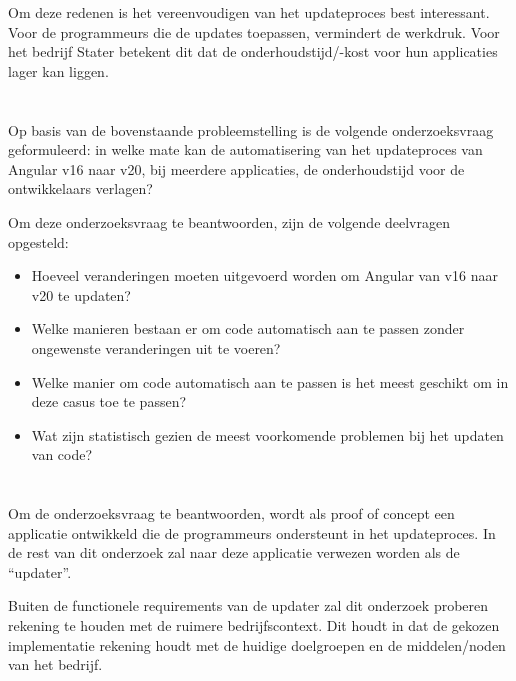 Om deze redenen is het vereenvoudigen van het updateproces best interessant.
Voor de programmeurs die de updates toepassen, vermindert de werkdruk.
Voor het bedrijf Stater betekent dit dat de onderhoudstijd/-kost voor hun applicaties lager kan liggen.

\section{}%
\label{sec:onderzoeksvraag}

Op basis van de bovenstaande probleemstelling is de volgende onderzoeksvraag geformuleerd: in welke mate kan de automatisering van het updateproces van Angular v16 naar v20, bij meerdere applicaties, de onderhoudstijd voor de ontwikkelaars verlagen?

Om deze onderzoeksvraag te beantwoorden, zijn de volgende deelvragen opgesteld:
\begin{itemize}
  \item Hoeveel veranderingen moeten uitgevoerd worden om Angular van v16 naar v20 te updaten?
  \item Welke manieren bestaan er om code automatisch aan te passen zonder ongewenste veranderingen uit te voeren?
  \item Welke manier om code automatisch aan te passen is het meest geschikt om in deze casus toe te passen?
  \item Wat zijn statistisch gezien de meest voorkomende problemen bij het updaten van code?
\end{itemize}

\section{}%
\label{sec:onderzoeksdoelstelling}

Om de onderzoeksvraag te beantwoorden, wordt als proof of concept een applicatie ontwikkeld die de programmeurs ondersteunt in het updateproces.
In de rest van dit onderzoek zal naar deze applicatie verwezen worden als de ``updater''.

Buiten de functionele requirements van de updater zal dit onderzoek proberen rekening te houden met de ruimere bedrijfscontext.
Dit houdt in dat de gekozen implementatie rekening houdt met de huidige doelgroepen en de middelen/noden van het bedrijf.

